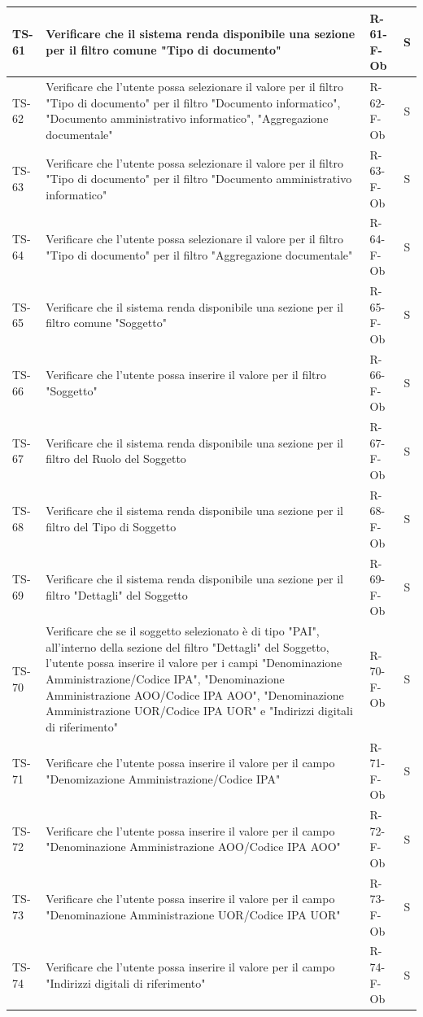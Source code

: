 \documentclass[a4paper,12pt]{article}
\begin{document}
\begin{longtable}{|p{1.5cm}|p{8.3cm}|p{2.4cm}|c|}
\hline
TS-61 & Verificare che il sistema renda disponibile una sezione per il filtro comune "Tipo di documento" & R-61-F-Ob & S \\
\hline
TS-62 & Verificare che l'utente possa selezionare il valore per il filtro "Tipo di documento" per il filtro "Documento informatico", "Documento amministrativo informatico", "Aggregazione documentale" & R-62-F-Ob & S \\
\hline
TS-63 & Verificare che l'utente possa selezionare il valore per il filtro "Tipo di documento" per il filtro "Documento amministrativo informatico" & R-63-F-Ob & S \\
\hline
TS-64 & Verificare che l'utente possa selezionare il valore per il filtro "Tipo di documento" per il filtro "Aggregazione documentale" & R-64-F-Ob & S \\
\hline
TS-65 & Verificare che il sistema renda disponibile una sezione per il filtro comune "Soggetto" & R-65-F-Ob & S \\
\hline
TS-66 & Verificare che l'utente possa inserire il valore per il filtro "Soggetto" & R-66-F-Ob & S \\
\hline
TS-67 & Verificare che il sistema renda disponibile una sezione per il filtro del Ruolo del Soggetto & R-67-F-Ob & S \\
\hline
TS-68 & Verificare che il sistema renda disponibile una sezione per il filtro del Tipo di Soggetto & R-68-F-Ob & S \\
\hline
TS-69 & Verificare che il sistema renda disponibile una sezione per il filtro "Dettagli" del Soggetto & R-69-F-Ob & S \\
\hline
TS-70 & Verificare che se il soggetto selezionato è di tipo "PAI", all'interno della sezione del filtro "Dettagli" del Soggetto, l'utente possa inserire il valore per i campi "Denominazione Amministrazione/Codice IPA", "Denominazione Amministrazione AOO/Codice IPA AOO", "Denominazione Amministrazione UOR/Codice IPA UOR" e "Indirizzi digitali di riferimento" & R-70-F-Ob & S \\
\hline
TS-71 & Verificare che l'utente possa inserire il valore per il campo "Denomizazione Amministrazione/Codice IPA" & R-71-F-Ob & S \\
\hline
TS-72 & Verificare che l'utente possa inserire il valore per il campo "Denominazione Amministrazione AOO/Codice IPA AOO" & R-72-F-Ob & S \\
\hline
TS-73 & Verificare che l'utente possa inserire il valore per il campo "Denominazione Amministrazione UOR/Codice IPA UOR" & R-73-F-Ob & S \\
\hline
TS-74 & Verificare che l'utente possa inserire il valore per il campo "Indirizzi digitali di riferimento" & R-74-F-Ob & S \\


\end{longtable}
\end{document}
